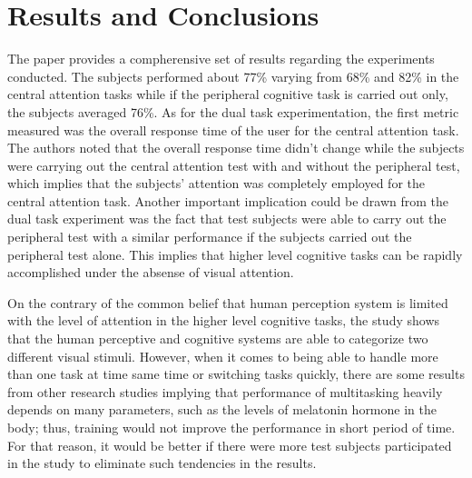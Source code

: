 \documentclass[11pt]{article}
\begin{document}
\section*{Results and Conclusions}
The paper provides a compherensive set of results regarding the experiments conducted.
The subjects performed about 77\% varying from 68\% and 82\% in the central attention tasks while if the peripheral cognitive task is carried out only, the subjects averaged 76\%.
As for the dual task experimentation, the first metric measured was the overall response time of the user for the central attention task.
The authors noted that the overall response time didn't change while the subjects were carrying out the central attention test with and without the peripheral test, which implies that the subjects' attention was completely employed for the central attention task.
Another important implication could be drawn from the dual task experiment was the fact that test subjects were able to carry out the peripheral test with a similar performance if the subjects carried out the peripheral test alone.
This implies that higher level cognitive tasks can be rapidly accomplished under the absense of visual attention.

On the contrary of the common belief that human perception system is limited with the level of attention in the higher level cognitive tasks, the study shows that the human perceptive and cognitive systems are able to categorize two different visual stimuli.
However, when it comes to being able to handle more than one task at time same time or switching tasks quickly, there are some results from other research studies implying that performance of multitasking heavily depends on many parameters, such as the levels of melatonin hormone in the body; thus, training would not improve the performance in short period of time.
For that reason, it would be better if there were more test subjects participated in the study to eliminate such tendencies in the results.
% 
% 
\end{document}
